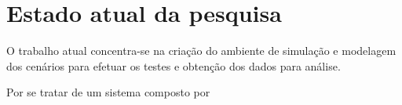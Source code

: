 \section{Estado atual da pesquisa}

O trabalho atual concentra-se na criação do ambiente de simulação e modelagem
dos cenários para efetuar os testes e obtenção dos dados para análise. 


Por se tratar de um sistema composto por 

